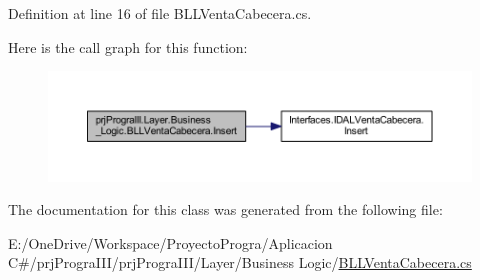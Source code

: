 Definition at line 16 of file B\+L\+L\+Venta\+Cabecera.\+cs.

Here is the call graph for this function\+:
\nopagebreak
\begin{figure}[H]
\begin{center}
\leavevmode
\includegraphics[width=350pt]{classprj_progra_i_i_i_1_1_layer_1_1_business___logic_1_1_b_l_l_venta_cabecera_a4e982cb2c77f88dd3d2ae1f8228ac3ae_cgraph}
\end{center}
\end{figure}


The documentation for this class was generated from the following file\+:\begin{DoxyCompactItemize}
\item 
E\+:/\+One\+Drive/\+Workspace/\+Proyecto\+Progra/\+Aplicacion C\#/prj\+Progra\+I\+I\+I/prj\+Progra\+I\+I\+I/\+Layer/\+Business Logic/\hyperlink{_b_l_l_venta_cabecera_8cs}{B\+L\+L\+Venta\+Cabecera.\+cs}\end{DoxyCompactItemize}
